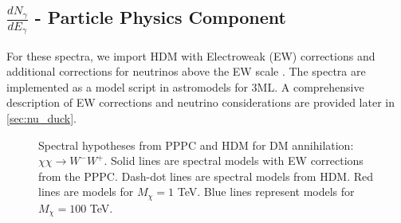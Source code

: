 \subsection{$\frac{dN_\gamma}{dE_\gamma}$ - Particle Physics Component}\label{sec:mtd_particlephysics}

For these spectra, we import HDM with Electroweak (EW) corrections and additional corrections for neutrinos above the EW scale \cite{Rodd:HDM_spec}.
The spectra are implemented as a model script in astromodels for 3ML.
A comprehensive description of EW corrections and neutrino considerations are provided later in \cref{sec:nu_duck}.

\begin{figure}[t]
    \caption{Spectral hypotheses from PPPC \cite{Cirelli_2011} and HDM \cite{Rodd:HDM_spec} for DM annihilation: $\chi\chi \rightarrow W^-W^+$. Solid lines are spectral models with EW corrections from the PPPC. Dash-dot lines are spectral models from HDM. Red lines are models for $M_\chi = 1$ TeV. Blue lines represent models for $M_\chi = 100$ TeV.}
    \label{fig:pppc_vs_hdm}
\end{figure}

